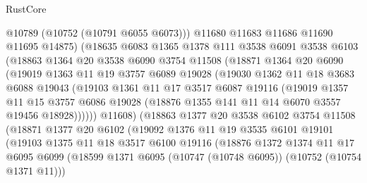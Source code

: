 \begin{lexlean}{RustCore}
\begin{coremodule}
                  @10789
                  (@10752 (@10791 @6055 @6073)))
                @11680
                @11683
                @11686
                @11690
                @11695
                @14875)
              (@18635
                @6083
                @1365
                @1378
                @111
                @3538
                @6091
                @3538
                @6103
                (@18863
                  @1364
                  @20
                  @3538
                  @6090
                  @3754
                  @11508
                  (@18871
                    @1364
                    @20
                    @6090
                    (@19019
                      @1363
                      @11
                      @19
                      @3757
                      @6089
                      @19028
                      (@19030
                        @1362
                        @11
                        @18
                        @3683
                        @6088
                        @19043
                        (@19103
                          @1361
                          @11
                          @17
                          @3517
                          @6087
                          @19116
                          (@19019
                            @1357
                            @11
                            @15
                            @3757
                            @6086
                            @19028
                            (@18876 @1355 @141 @11 @14 @6070 @3557 @19456 @18928))))))
                  @11608)
                (@18863
                  @1377
                  @20
                  @3538
                  @6102
                  @3754
                  @11508
                  (@18871
                    @1377
                    @20
                    @6102
                    (@19092
                      @1376
                      @11
                      @19
                      @3535
                      @6101
                      @19101
                      (@19103
                        @1375
                        @11
                        @18
                        @3517
                        @6100
                        @19116
                        (@18876
                          @1372
                          @1374
                          @11
                          @17
                          @6095
                          @6099
                          (@18599 @1371 @6095 (@10747 (@10748 @6095)) (@10752 (@10754 @1371 @11)))

\end{coremodule}
\end{lexlean}
